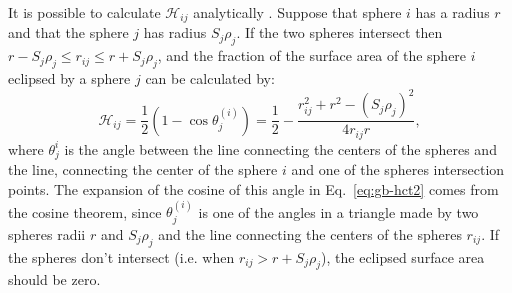 \documentclass[11pt]{book}
\begin{document}
It is possible to calculate $\mathscr{H}_{ij}$ analytically \cite{SchaeferJMB90,HawkinsCPL95,HawkinsJPC96}. Suppose that sphere $i$ has a radius $r$ and that the sphere $j$ has radius $S_{j}\rho_{j}$. If the two spheres intersect then $r-S_{j}\rho_{j}\le r_{ij}\le r+S_{j}\rho_{j}$, and the fraction of the surface area of the sphere $i$ eclipsed by a sphere $j$ can be calculated by:
\begin{equation}\label{eq:gb-hct2}
\mathscr{H}_{ij}=\frac{1}{2}(1-\cos{\theta_{j}^{(i)}})=\frac{1}{2}-\frac{r_{ij}^{2}+r^{2}-(S_{j}\rho_{j})^{2}}{4r_{ij}r},
\end{equation}
where $\theta_{j}^{i}$ is the angle between the line connecting the centers of the spheres and the line, connecting the center of the sphere $i$ and one of the spheres intersection points. The expansion of the cosine of this angle in Eq.~\ref{eq:gb-hct2} comes from the cosine theorem, since $\theta_{j}^{(i)}$ is one of the angles in a triangle made by two spheres radii $r$ and $S_{j}\rho_{j}$ and the line connecting the centers of the spheres $r_{ij}$. If the spheres don't intersect (i.e. when $r_{ij}>r+S_{j}\rho_{j}$), the eclipsed surface area should be zero.
\end{document}
